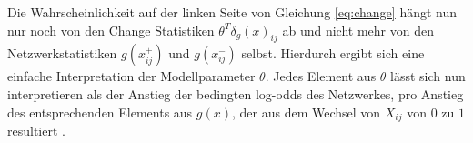 \documentclass[a4paper,ngerman,oneside,titlepage,bibliography=totoc,11pt]{scrreprt}
\begin{document}
Die Wahrscheinlichkeit auf der linken Seite von Gleichung \ref{eq:change} hängt nun nur noch von den Change Statistiken $\theta^T\delta_g(x)_{ij}$ ab und nicht mehr von den Netzwerkstatistiken $g(x^+_{ij})$ und $g(x^-_{ij})$ selbst.
Hierdurch ergibt sich eine einfache Interpretation der Modellparameter $\theta$. Jedes Element aus $\theta$ lässt sich nun interpretieren als der Anstieg der bedingten log-odds des Netzwerkes, pro Anstieg des entsprechenden Elements aus $g(x)$, der aus dem Wechsel von $X_{ij}$ von $0$ zu $1$ resultiert \citep{hunter2008ergm}.

\newpage









\newpage
\listoffigures
\newpage
\listoftables
\end{document}
